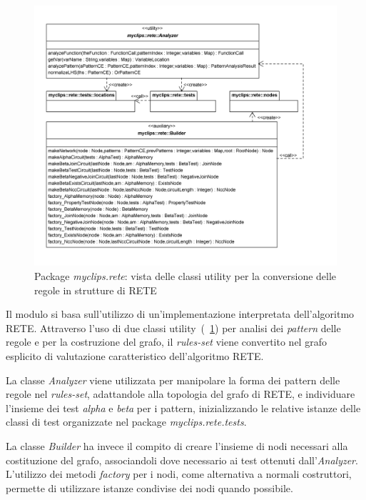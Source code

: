 \begin{figure}
\centering
\includegraphics[width=1.2\textwidth]{Immagini/Capitolo3/Classi/myclips_rete_Builders.png}
\caption{Package \emph{myclips.rete}: vista delle classi utility per la conversione delle regole in strutture di RETE}\label{fig:class-myclips-rete-builders}
\end{figure}

Il modulo si basa sull'utilizzo di un'implementazione interpretata dell'algoritmo RETE. Attraverso l'uso di due classi utility~(\figurename~\ref{fig:class-myclips-rete-builders}) per analisi dei \emph{pattern} delle regole e per la costruzione del grafo, il \emph{rules-set} viene convertito nel grafo esplicito di valutazione caratteristico dell'algoritmo RETE.

La classe \emph{Analyzer} viene utilizzata per manipolare la forma dei pattern delle regole nel \emph{rules-set}, adattandole alla topologia del grafo di RETE, e individuare l'insieme dei test \emph{alpha} e \emph{beta} per i pattern, inizializzando le relative istanze delle classi di test organizzate nel package \emph{myclips.rete.tests}.

La classe \emph{Builder} ha invece il compito di creare l'insieme di nodi necessari alla costituzione del grafo, associandoli dove necessario ai test ottenuti dall'\emph{Analyzer}.
L'utilizzo dei metodi \emph{factory} per i nodi, come alternativa a normali costruttori, permette di utilizzare istanze condivise dei nodi quando possibile.

